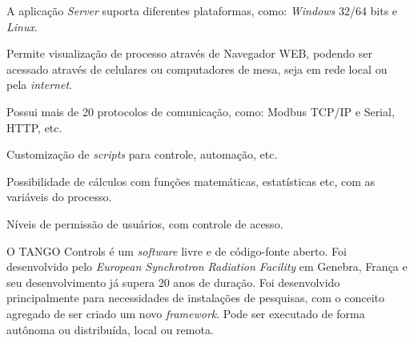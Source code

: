 	    \begin{alineascomponto}
    	    \item A aplicação \textit{Server} suporta diferentes plataformas, como: \textit{Windows} 32/64 bits e \textit{Linux}.
    	    \item Permite visualização de processo através de Navegador \gls{WEB}, podendo ser acessado através de celulares ou computadores de mesa, seja em rede local ou pela \textit{internet}.
        	\item Possui mais de 20 protocolos de comunicação, como: Modbus \gls{TCP/IP} e Serial, \gls{HTTP}, etc.
        	\item Customização de \textit{scripts} para controle, automação, etc.
        	\item Possibilidade de cálculos com funções matemáticas, estatísticas etc, com as variáveis do processo.
        	\item Níveis de permissão de usuários, com controle de acesso.
        \end{alineascomponto}
	    
    \label{sec:tango}

        O TANGO Controls \cite{Tango} é um \textit{software} livre e de código-fonte aberto. Foi desenvolvido pelo \textit{European Synchrotron Radiation Facility} em Genebra, França e seu desenvolvimento já supera 20 anos de duração. Foi desenvolvido principalmente para necessidades de instalações de pesquisas, com o conceito agregado de ser criado um novo \textit{framework}. Pode ser executado de forma autônoma ou distribuída, local ou remota.

        \begin{figure}[!h]
	    \end{figure}
	    
